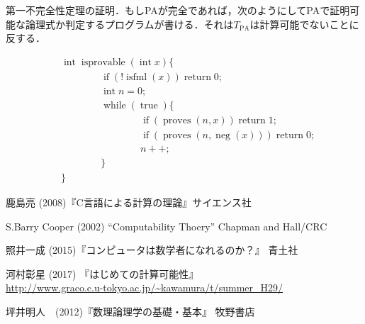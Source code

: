 \documentclass[uplatex]{jsarticle}
\theoremstyle{definition} %
\begin{document}
\noindent 第一不完全性定理の証明．もしPAが完全であれば，次のようにしてPAで証明可能な論理式か判定するプログラムが書ける．それは$T_{\mathrm{PA}}$は計算可能でないことに反する．

\begin{align*}
&\operatorname{int} \operatorname{isprovable}(\operatorname{int} x) \{ \\
&\hspace{4em}\operatorname{if} (!\operatorname{isfml}(x)) \operatorname{return} 0; \\
&\hspace{4em}\operatorname{int} n = 0; \\
&\hspace{4em}\operatorname{while} (\operatorname{true}) \{ \\
&\hspace{4em}\hspace{4em}\operatorname{if} (\operatorname{proves}(n, x)) \operatorname{return} 1; \\
&\hspace{4em}\hspace{4em}\operatorname{if} (\operatorname{proves}(n, \operatorname{neg}(x))) \operatorname{return} 0; \\
&\hspace{4em}\hspace{4em}n ++; \\
&\hspace{4em}\} \\
&\}
\end{align*}

\begin{thebibliography}{9}
\item 鹿島亮 (2008)『C言語による計算の理論』サイエンス社
\item S.Barry Cooper (2002) “Computability Thoery” Chapman and Hall/CRC
\item 照井一成 (2015)『コンピュータは数学者になれるのか？』 青土社
\item 河村彰星 (2017) 『はじめての計算可能性』 \\ \url{http://www.graco.c.u-tokyo.ac.jp/~kawamura/t/summer_H29/}
\item 坪井明人　(2012)『数理論理学の基礎・基本』 牧野書店
\end{thebibliography}
\end{document}
